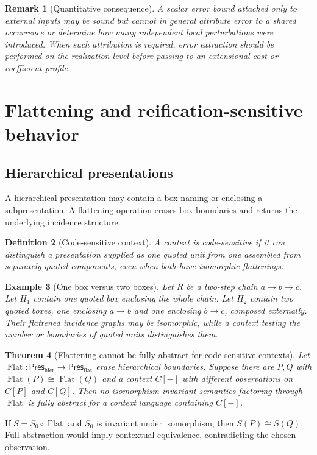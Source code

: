 \documentclass[12pt,a4paper,twoside]{extarticle}
\makeatletter
\theoremstyle{compactplain}
\newtheorem{theorem}{Theorem}[section]
\theoremstyle{compactdef}
\newtheorem{definition}[theorem]{Definition}
\newtheorem{example}[theorem]{Example}
\newtheorem{remark}[theorem]{Remark}
\renewenvironment{proof}[1][\proofname]{\par\pushQED{\qed}\normalfont
  \topsep2pt\trivlist\item[\hskip\labelsep\bfseries #1\@addpunct{.}]\ignorespaces}
 {\popQED\endtrivlist\@endpefalse}
\newcommand{\Pres}{\mathsf{Pres}}
\newcommand{\blank}{[-]}
\newcommand{\iso}{\cong}
\makeatother
\begin{document}
\begin{remark}[Quantitative consequence]
A scalar error bound attached only to external inputs may be sound but cannot in general attribute error to a shared occurrence or determine how many independent local perturbations were introduced.  When such attribution is required, error extraction should be performed on the realization level before passing to an extensional cost or coefficient profile.
\end{remark}
\section{Flattening and reification-sensitive behavior}

\subsection{Hierarchical presentations}
A hierarchical presentation may contain a box naming or enclosing a subpresentation. A flattening operation erases box boundaries and returns the underlying incidence structure.

\begin{definition}[Code-sensitive context]
A context is code-sensitive if it can distinguish a presentation supplied as one quoted unit from one assembled from separately quoted components, even when both have isomorphic flattenings.
\end{definition}

\begin{example}[One box versus two boxes]
Let $R$ be a two-step chain $a\to b\to c$. Let $H_1$ contain one quoted box enclosing the whole chain. Let $H_2$ contain two quoted boxes, one enclosing $a\to b$ and one enclosing $b\to c$, composed externally. Their flattened incidence graphs may be isomorphic, while a context testing the number or boundaries of quoted units distinguishes them.
\end{example}

\begin{theorem}[Flattening cannot be fully abstract for code-sensitive contexts]
Let $\operatorname{Flat}:\Pres_{\mathrm{hier}}\to\Pres_{\mathrm{flat}}$ erase hierarchical boundaries. Suppose there are $P,Q$ with $\operatorname{Flat}(P)\iso\operatorname{Flat}(Q)$ and a context $C\blank$ with different observations on $C[P]$ and $C[Q]$. Then no isomorphism-invariant semantics factoring through $\operatorname{Flat}$ is fully abstract for a context language containing $C\blank$.
\end{theorem}
\begin{proof}
If $S=S_0\circ\operatorname{Flat}$ and $S_0$ is invariant under isomorphism, then $S(P)\iso S(Q)$. Full abstraction would imply contextual equivalence, contradicting the chosen observation.
\end{proof}
\end{document}
